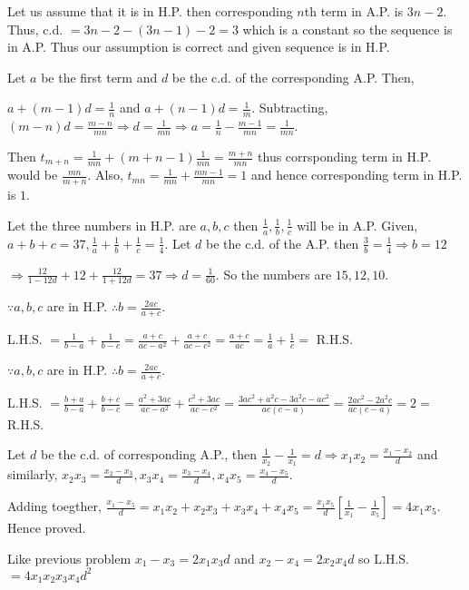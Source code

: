   Let us assume that it is in H.P. then corresponding $n$th term in A.P. is $3n - 2$. Thus, c.d. $= 3n - 2 -
  (3n - 1) - 2 = 3$ which is a constant so the sequence is in A.P. Thus our assumption is correct and given
  sequence is in H.P.
\item Let $a$ be the first term and $d$ be the c.d. of the corresponding A.P. Then,

  $a + (m - 1)d = \frac{1}{n}$ and $a + (n - 1)d = \frac{1}{m}$. Subtracting, $(m - n)d = \frac{m -
  n}{mn}\Rightarrow d = \frac{1}{mn} \Rightarrow a = \frac{1}{n} - \frac{m - 1}{mn} = \frac{1}{mn}$.

  Then $t_{m + n} = \frac{1}{mn} + (m + n - 1)\frac{1}{mn} = \frac{m + n}{mn}$ thus corrsponding term in
  H.P. would be $\frac{mn}{m + n}$. Also, $t_{mn} = \frac{1}{mn} + \frac{mn - 1}{mn} = 1$ and hence
  corresponding term in H.P. is $1$.
\item Let the three numbers in H.P. are $a, b, c$ then $\frac{1}{a}, \frac{1}{b}, \frac{1}{c}$ will be in
  A.P. Given, $a + b + c = 37, \frac{1}{a} + \frac{1}{b} + \frac{1}{c} = \frac{1}{4}$. Let $d$ be the
  c.d. of the A.P. then $\frac{3}{b} = \frac{1}{4} \Rightarrow b = 12$

  $\Rightarrow \frac{12}{1 - 12d} + 12 + \frac{12}{1 + 12d} = 37 \Rightarrow d = \frac{1}{60}$. So the
  numbers are $15, 12, 10$.
\item $\because a, b, c$ are in H.P. $\therefore b = \frac{2ac}{a + c}$.

  L.H.S. $= \frac{1}{b - a} + \frac{1}{b - c} = \frac{a + c}{ac - a^2} + \frac{a + c}{ac - c^2} = \frac{a + c}{ac} =
  \frac{1}{a} + \frac{1}{c} =$ R.H.S.
\item $\because a, b, c$ are in H.P. $\therefore b = \frac{2ac}{a + c}$.

  L.H.S. $= \frac{b + a}{b - a} + \frac{b + c}{b - c} = \frac{a^2 + 3ac}{ac - a^2} + \frac{c^2 + 3ac}{ac -
    c^2} = \frac{3ac^2 + a^2c - 3a^2c - ac^2}{ac(c - a)} = \frac{2ac^2 - 2a^2c}{ac(c - a)} = 2 =$ R.H.S.
\item Let $d$ be the c.d. of corresponding A.P., then $\frac{1}{x_2} - \frac{1}{x_1} = d \Rightarrow x_1x_2
  = \frac{x_1 - x_2}{d}$ and similarly, $x_2x_3 = \frac{x_2 - x_3}{d}, x_3x_4 = \frac{x_3 - x_4}{d}, x_4x_5
  = \frac{x_4 - x_5}{d}$.

  Adding toegther, $\frac{x_1 - x_5}{d} = x_1x_2 + x_2x_3 + x_3x_4 + x_4x_5 =
  \frac{x_1x_5}{d}\left[\frac{1}{x_1} - \frac{1}{x_5}\right] = 4x_1x_5$. Hence proved.
\item Like previous problem $x_1 - x_3 = 2x_1x_3d$ and $x_2 - x_4 = 2x_2x_4d$ so L.H.S. $= 4x_1x_2x_3x_4d^2$

